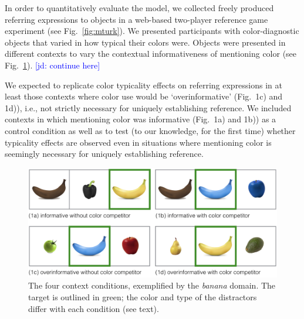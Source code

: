 \documentclass[10pt,letterpaper]{article}
\newcommand{\jd}[1]{\textcolor{Blue}{[jd: #1]}}
\newcommand{\figref}[1]{Fig.~\ref{#1}}
\begin{document}
In order to quantitatively evaluate the model, we collected freely produced referring expressions to objects in a web-based two-player reference game experiment (see \figref{fig:mturk}). We presented participants with color-diagnostic objects that varied in how typical their colors were. Objects were presented in different contexts to vary the contextual informativeness of mentioning color (see \figref{fig:contexts}). \jd{continue here} 


We expected to replicate color typicality effects on referring expressions in at least those contexts where color use would be `overinformative' (Fig.~1c) and 1d)), i.e., not strictly necessary for uniquely establishing reference. We included contexts in which mentioning color was informative (Fig.~1a) and 1b)) as a control condition as well as to test (to our knowledge, for the first time) whether typicality effects are observed even in situations where mentioning color is seemingly necessary for uniquely establishing reference.

\begin{figure}
	\centering
	\includegraphics[width=.5\textwidth]{graphs/context_overview}
	\caption{The four context conditions, exemplified by the \textit{banana} domain. The target is outlined in green; the color and type of the distractors differ with each condition (see text).
	}
	\label{fig:contexts}
\end{figure}
\end{document}
